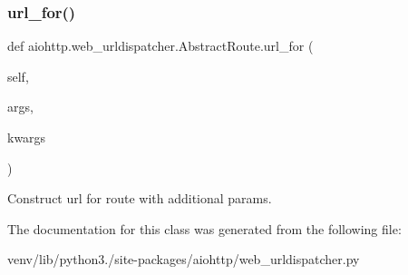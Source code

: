 \subsubsection{\texorpdfstring{url\+\_\+for()}{url\_for()}}
{\footnotesize\ttfamily def aiohttp.\+web\+\_\+urldispatcher.\+Abstract\+Route.\+url\+\_\+for (\begin{DoxyParamCaption}\item[{}]{self,  }\item[{}]{args,  }\item[{}]{kwargs }\end{DoxyParamCaption})}

\begin{DoxyVerb}Construct url for route with additional params.\end{DoxyVerb}
 

The documentation for this class was generated from the following file\+:\begin{DoxyCompactItemize}
\item 
venv/lib/python3./site-\/packages/aiohttp/web\+\_\+urldispatcher.\+py\end{DoxyCompactItemize}
